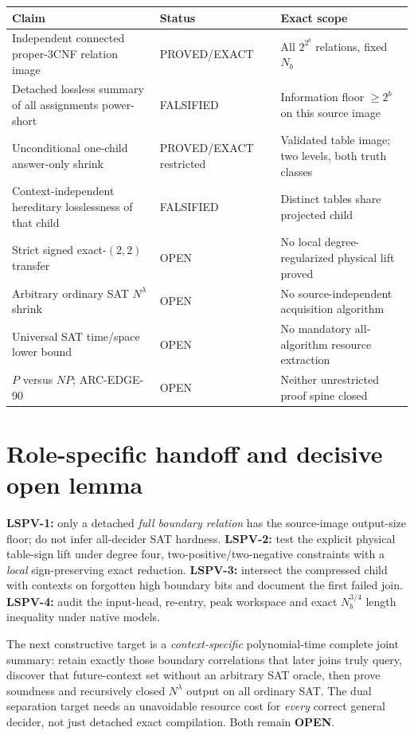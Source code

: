 \documentclass[11pt]{article}
\begin{document}
\begin{center}\small
\begin{tabularx}{\linewidth}{p{.42\linewidth}p{.19\linewidth}X}
\toprule Claim & Status & Exact scope\\\midrule
Independent connected proper-3CNF relation image & PROVED/EXACT & All $2^{2^b}$ relations, fixed $N_b$\\
Detached lossless summary of all assignments power-short & FALSIFIED & Information floor $\ge2^b$ on this source image\\
Unconditional one-child answer-only shrink & PROVED/EXACT restricted & Validated table image; two levels, both truth classes\\
Context-independent hereditary losslessness of that child & FALSIFIED & Distinct tables share projected child\\
Strict signed exact-$(2,2)$ transfer & OPEN & No local degree-regularized physical lift proved\\
Arbitrary ordinary SAT $N^\lambda$ shrink & OPEN & No source-independent acquisition algorithm\\
Universal SAT time/space lower bound & OPEN & No mandatory all-algorithm resource extraction\\
$P$ versus $NP$; ARC-EDGE-90 & OPEN & Neither unrestricted proof spine closed\\
\bottomrule
\end{tabularx}
\end{center}

\section{Role-specific handoff and decisive open lemma}
\noindent\textbf{LSPV-1:} only a detached \emph{full boundary relation} has the source-image output-size floor; do not infer all-decider SAT hardness. \textbf{LSPV-2:} test the explicit physical table-sign lift under degree four, two-positive/two-negative constraints with a \emph{local} sign-preserving exact reduction. \textbf{LSPV-3:} intersect the compressed child with contexts on forgotten high boundary bits and document the first failed join. \textbf{LSPV-4:} audit the input-head, re-entry, peak workspace and exact $N_b^{3/4}$ length inequality under native models.

The next constructive target is a \emph{context-specific} polynomial-time complete joint summary: retain exactly those boundary correlations that later joins truly query, discover that future-context set without an arbitrary SAT oracle, then prove soundness and recursively closed $N^\lambda$ output on all ordinary SAT. The dual separation target needs an unavoidable resource cost for \emph{every} correct general decider, not just detached exact compilation. Both remain \textbf{OPEN}.
\end{document}
